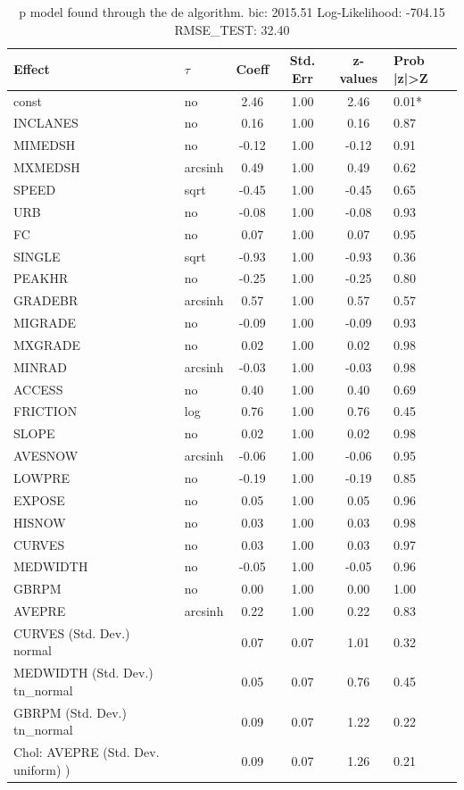 \begin{table}
	\caption{p model found through the de algorithm. bic: 2015.51 Log-Likelihood: -704.15 RMSE_TEST: 32.40}
	\begin{center}
		\begin{tabular}{|l|l|c|c|c|l|}
			\hline
			Effect & $\tau$ & Coeff & Std. Err & z-values & Prob |z|>Z \\
			\hline
			const & no & 2.46 & 1.00 & 2.46 & 0.01* \\
			\hline
			INCLANES & no & 0.16 & 1.00 & 0.16 & 0.87 \\
			\hline
			MIMEDSH & no & -0.12 & 1.00 & -0.12 & 0.91 \\
			\hline
			MXMEDSH & arcsinh & 0.49 & 1.00 & 0.49 & 0.62 \\
			\hline
			SPEED & sqrt & -0.45 & 1.00 & -0.45 & 0.65 \\
			\hline
			URB & no & -0.08 & 1.00 & -0.08 & 0.93 \\
			\hline
			FC & no & 0.07 & 1.00 & 0.07 & 0.95 \\
			\hline
			SINGLE & sqrt & -0.93 & 1.00 & -0.93 & 0.36 \\
			\hline
			PEAKHR & no & -0.25 & 1.00 & -0.25 & 0.80 \\
			\hline
			GRADEBR & arcsinh & 0.57 & 1.00 & 0.57 & 0.57 \\
			\hline
			MIGRADE & no & -0.09 & 1.00 & -0.09 & 0.93 \\
			\hline
			MXGRADE & no & 0.02 & 1.00 & 0.02 & 0.98 \\
			\hline
			MINRAD & arcsinh & -0.03 & 1.00 & -0.03 & 0.98 \\
			\hline
			ACCESS & no & 0.40 & 1.00 & 0.40 & 0.69 \\
			\hline
			FRICTION & log & 0.76 & 1.00 & 0.76 & 0.45 \\
			\hline
			SLOPE & no & 0.02 & 1.00 & 0.02 & 0.98 \\
			\hline
			AVESNOW & arcsinh & -0.06 & 1.00 & -0.06 & 0.95 \\
			\hline
			LOWPRE & no & -0.19 & 1.00 & -0.19 & 0.85 \\
			\hline
			EXPOSE & no & 0.05 & 1.00 & 0.05 & 0.96 \\
			\hline
			HISNOW & no & 0.03 & 1.00 & 0.03 & 0.98 \\
			\hline
			CURVES & no & 0.03 & 1.00 & 0.03 & 0.97 \\
			\hline
			MEDWIDTH & no & -0.05 & 1.00 & -0.05 & 0.96 \\
			\hline
			GBRPM & no & 0.00 & 1.00 & 0.00 & 1.00 \\
			\hline
			AVEPRE & arcsinh & 0.22 & 1.00 & 0.22 & 0.83 \\
			\hline
			CURVES (Std. Dev.) normal &  & 0.07 & 0.07 & 1.01 & 0.32 \\
			\hline
			MEDWIDTH (Std. Dev.) tn_normal &  & 0.05 & 0.07 & 0.76 & 0.45 \\
			\hline
			GBRPM (Std. Dev.) tn_normal &  & 0.09 & 0.07 & 1.22 & 0.22 \\
			\hline
			 Chol: AVEPRE (Std. Dev. uniform) ) &  & 0.09 & 0.07 & 1.26 & 0.21 \\
			\hline
		\end{tabular}
	\end{center}
\end{table}